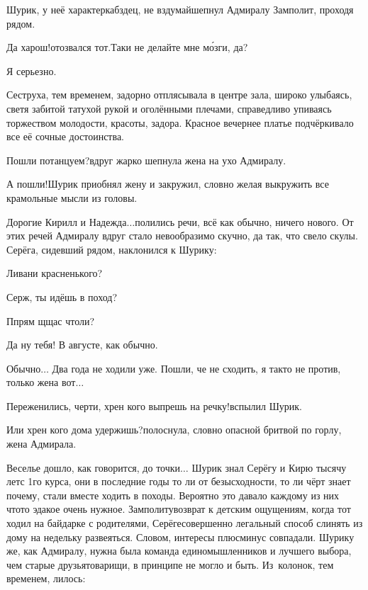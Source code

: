 {\diagdash Шурик, у неё характер\mdash кабздец, не вздумай\mdash шепнул Адмиралу Замполит, проходя рядом. 

\diagdash Да харош!\mdash отозвался тот.\mdash Таки не делайте мне м\'{о}зги, да?

\diagdash Я серьезно.

Сеструха, тем временем, задорно отплясывала в центре зала, широко улыбаясь, светя забитой татухой рукой и оголёнными плечами, справедливо упиваясь торжеством молодости, красоты, задора. Красное вечернее платье подчёркивало все её сочные достоинства.

\diagdash Пошли потанцуем?\mdash вдруг жарко шепнула жена на ухо Адмиралу.

\diagdash А пошли!\mdash Шурик приобнял жену и закружил, словно желая выкружить все крамольные мысли из головы. 

\diagdash Дорогие Кирилл и Надежда$\ldots$\mdash полились речи, всё как обычно, ничего нового. От этих речей Адмиралу вдруг стало невообразимо скучно, да так, что свело скулы. Серёга, сидевший рядом, наклонился к Шурику:

\diagdash Ливани красненького?

\diagdash Серж, ты идёшь в поход? 

\diagdash П\sdash прям щ\sdash щас чтоли?

\diagdash Да ну тебя! В августе, как обычно.

\diagdash Обычно$\ldots$ Два года не ходили уже. Пошли, че не сходить, я так\sdash то не против, только жена вот$\ldots$

\diagdash Переженились, черти, хрен кого выпрешь на речку!\mdash вспылил Шурик.

\diagdash Или хрен кого дома удержишь?\mdash полоснула, словно опасной бритвой по горлу, жена Адмирала. 

Веселье дошло, как говорится, до точки$\ldots$ Шурик знал Серёгу и Кирю тысячу лет\mdash с 1\sdash го курса, они в последние годы то ли от безысходности, то ли чёрт знает почему, стали вместе ходить в походы. Вероятно это давало каждому из них что\sdash то эдакое очень нужное. Замполиту\mdash возврат к детским ощущениям, когда тот ходил на байдарке с родителями, Серёге\mdash совершенно легальный способ слинять из дому на недельку развеяться. Словом, интересы плюс\sdash минус совпадали. Шурику же, как Адмиралу, нужна была команда единомышленников и лучшего выбора, чем старые друзья\sdash товарищи, в принципе не могло и быть. Из~колонок, тем временем, лилось:

}
